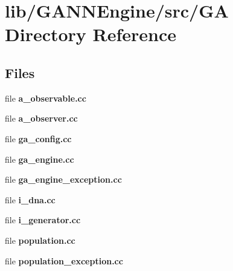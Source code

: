 \section{lib/\+G\+A\+N\+N\+Engine/src/\+G\+A Directory Reference}
\label{dir_5a3333125f81eae97bc3468f9ca4a911}
\subsection*{Files}
\begin{DoxyCompactItemize}
\item 
file {\bfseries a\+\_\+observable.\+cc}
\item 
file {\bfseries a\+\_\+observer.\+cc}
\item 
file {\bfseries ga\+\_\+config.\+cc}
\item 
file {\bfseries ga\+\_\+engine.\+cc}
\item 
file {\bfseries ga\+\_\+engine\+\_\+exception.\+cc}
\item 
file {\bfseries i\+\_\+dna.\+cc}
\item 
file {\bfseries i\+\_\+generator.\+cc}
\item 
file {\bfseries population.\+cc}
\item 
file {\bfseries population\+\_\+exception.\+cc}
\end{DoxyCompactItemize}
